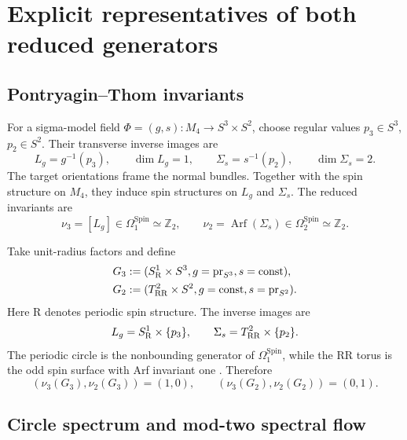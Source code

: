 \documentclass[11pt]{article}
\theoremstyle{definition}
\theoremstyle{remark}
\newcommand{\ZZ}{\mathbb Z}
\newcommand{\Arf}{\operatorname{Arf}}
\begin{document}
\section{Explicit representatives of both reduced generators}

\subsection{Pontryagin--Thom invariants}

For a sigma-model field \(\Phi=(g,s):M_4\to S^3\times S^2\), choose regular
values \(p_3\in S^3\), \(p_2\in S^2\).  Their transverse inverse images are
\begin{equation}
 L_g=g^{-1}(p_3),\qquad \dim L_g=1,
 \qquad
 \Sigma_s=s^{-1}(p_2),\qquad \dim\Sigma_s=2.
 \label{eq:inverse-images}
\end{equation}
The target orientations frame the normal bundles.  Together with the spin
structure on \(M_4\), they induce spin structures on \(L_g\) and
\(\Sigma_s\).  The reduced invariants are
\begin{equation}
 \nu_3=[L_g]\in\Omega_1^{\mathrm{Spin}}\simeq\ZZ_2,
 \qquad
 \nu_2=\Arf(\Sigma_s)\in\Omega_2^{\mathrm{Spin}}\simeq\ZZ_2.
 \label{eq:nu-definitions}
\end{equation}

Take unit-radius factors and define
\begin{align}
 G_3&:=
 (S^1_{\rm R}\times S^3,
  g=\operatorname{pr}_{S^3},s={\rm const}),
 \label{eq:G3}\\
 G_2&:=
 (T^2_{\rm RR}\times S^2,
  g={\rm const},s=\operatorname{pr}_{S^2}).
 \label{eq:G2}
\end{align}
Here R denotes periodic spin structure.  The inverse images are
\begin{equation}
 L_g=S^1_{\rm R}\times\{p_3\},
 \qquad
 \Sigma_s=T^2_{\rm RR}\times\{p_2\}.
\end{equation}
The periodic circle is the nonbounding generator of
\(\Omega_1^{\mathrm{Spin}}\), while the RR torus is the odd spin surface with
Arf invariant one \cite{Atiyah1971}.  Therefore
\begin{equation}
 (\nu_3(G_3),\nu_2(G_3))=(1,0),
 \qquad
 (\nu_3(G_2),\nu_2(G_2))=(0,1).
 \label{eq:generator-values}
\end{equation}

\subsection{Circle spectrum and mod-two spectral flow}
\end{document}

